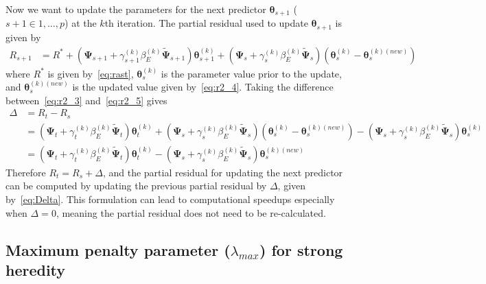 \documentclass[12pt,letter]{article}\usepackage[]{graphicx}\usepackage[]{color}
\newcommand{\btheta}{\boldsymbol{\theta}}
\newcommand{\bPsi}{\boldsymbol{\Psi}}
\begin{document}
Now we want to update the parameters for the next predictor $\btheta_{s+1}$ ($s+1 \in {1,\ldots, p}$) at the $k$th iteration. The partial residual used to update $\btheta_{s+1}$ is given by
\begin{align}
R_{s+1} & = R^\ast + (\bPsi_{s+1} + \gamma_{s+1}^{(k)}\beta_E^{(k)} \widetilde{\bPsi}_{s+1})\btheta_{s+1}^{(k)} + (\bPsi_s + \gamma_s^{(k)}\beta_E^{(k)} \widetilde{\bPsi}_s)(\btheta_s^{(k)} - \btheta_s^{(k)(new)}) \label{eq:r2_5}
\end{align}
where $R^\ast$ is given by~\eqref{eq:rast}, $\btheta_s^{(k)}$ is the parameter value prior to the update, and $\btheta_s^{(k)(new)}$ is the updated value given by~\eqref{eq:r2_4}. Taking the difference between~\eqref{eq:r2_3} and~\eqref{eq:r2_5} gives
\begin{align}
\Delta & = R_t - R_s \nonumber\\
& = (\bPsi_t + \gamma_t^{(k)}\beta_E^{(k)} \widetilde{\bPsi}_t)\btheta_t^{(k)} + (\bPsi_s + \gamma_s^{(k)}\beta_E^{(k)} \widetilde{\bPsi}_s)(\btheta_s^{(k)} - \btheta_s^{(k)(new)}) - (\bPsi_s + \gamma_s^{(k)}\beta_E^{(k)} \widetilde{\bPsi}_s)\btheta_s^{(k)} \nonumber\\
& = (\bPsi_t + \gamma_t^{(k)}\beta_E^{(k)} \widetilde{\bPsi}_t)\btheta_t^{(k)} - (\bPsi_s + \gamma_s^{(k)}\beta_E^{(k)} \widetilde{\bPsi}_s)\btheta_s^{(k)(new)} \label{eq:Delta}
\end{align}
Therefore $R_t = R_s + \Delta$, and the partial residual for updating the next predictor can be computed by updating the previous partial residual by $\Delta$, given by~\eqref{eq:Delta}. This formulation can lead to computational speedups especially when $\Delta = 0$, meaning the partial residual does not need to be re-calculated.

\subsection{Maximum penalty parameter ($\lambda_{max}$) for strong heredity}
\end{document}
